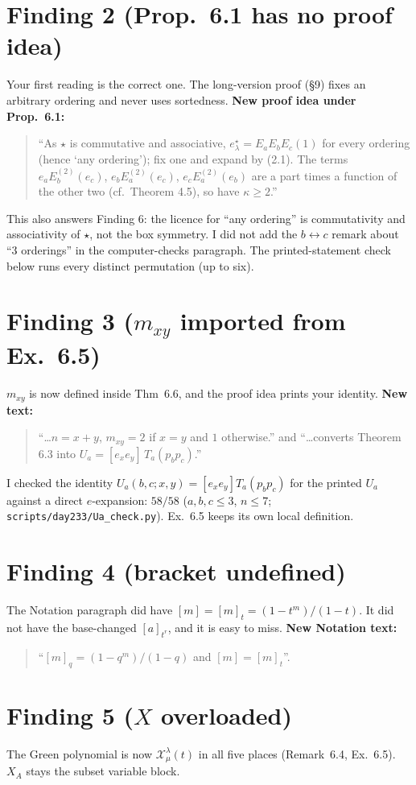 \documentclass[11pt]{article}
\begin{document}
\section*{Finding 2 (Prop.~6.1 has no proof idea)}
Your first reading is the correct one. The long-version proof (\S9) fixes an arbitrary ordering and never uses sortedness. \textbf{New proof idea under Prop.~6.1:}
\begin{quote}
``As $\star$ is commutative and associative, $e^\star_\lambda=E_aE_bE_c(1)$ for every ordering (hence `any ordering'); fix one and expand by (2.1). The terms $e_aE_b^{(2)}(e_c)$, $e_bE_a^{(2)}(e_c)$, $e_cE_a^{(2)}(e_b)$ are a part times a function of the other two (cf.\ Theorem 4.5), so have $\kappa\ge2$.''
\end{quote}
This also answers Finding 6: the licence for ``any ordering'' is commutativity and associativity of $\star$, not the box symmetry. I did not add the $b\leftrightarrow c$ remark about ``3 orderings'' in the computer-checks paragraph. The printed-statement check below runs every distinct permutation (up to six).

\section*{Finding 3 ($m_{xy}$ imported from Ex.~6.5)}
$m_{xy}$ is now defined inside Thm~6.6, and the proof idea prints your identity. \textbf{New text:}
\begin{quote}
``\ldots $n=x+y$, $m_{xy}=2$ if $x=y$ and $1$ otherwise.'' \quad and \quad ``\ldots converts Theorem 6.3 into $U_a=[e_xe_y]\,T_a(p_bp_c)$.''
\end{quote}
I checked the identity $U_a(b,c;x,y)=[e_xe_y]T_a(p_bp_c)$ for the printed $U_a$ against a direct $e$-expansion: $58/58$ ($a,b,c\le3$, $n\le7$; \texttt{scripts/day233/Ua\_check.py}). Ex.~6.5 keeps its own local definition.

\section*{Finding 4 (bracket undefined)}
The Notation paragraph did have $[m]=[m]_t=(1-t^m)/(1-t)$. It did not have the base-changed $[a]_{t^r}$, and it is easy to miss. \textbf{New Notation text:}
\begin{quote}
``$[m]_q=(1-q^m)/(1-q)$ and $[m]=[m]_t$''.
\end{quote}

\section*{Finding 5 ($X$ overloaded)}
The Green polynomial is now $\mathcal X^\lambda_\mu(t)$ in all five places (Remark~6.4, Ex.~6.5). $X_A$ stays the subset variable block.
\end{document}
